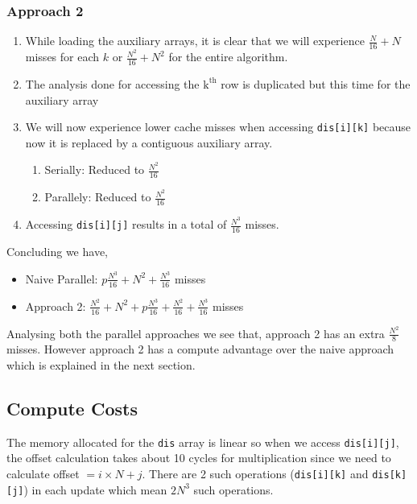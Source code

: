\documentclass{article}
\begin{document}
\subsubsection{Approach 2}
\begin{enumerate}
    \item While loading the auxiliary arrays, it is clear that we will experience $\frac{N}{16} + N$ misses for each $k$ or $\frac{N^2}{16} + N^2$ for the entire algorithm.
    \item The analysis done for accessing the $\mathrm{k}^{\mathrm{th}}$ row is duplicated but this time for the auxiliary array
    \item We will now experience lower cache misses when accessing \texttt{dis[i][k]} because now it is replaced by a contiguous auxiliary array.
    \begin{enumerate}
        \item Serially: Reduced to $\frac{N^2}{16}$
        \item Parallely: Reduced to $\frac{N^2}{16}$
    \end{enumerate}
    \item Accessing \texttt{dis[i][j]} results in a total of $\frac{N^3}{16}$ misses.
\end{enumerate}
Concluding we have,
\begin{itemize}
    \item Naive Parallel: $p\frac{N^3}{16} + N^2 + \frac{N^3}{16}$ misses
    \item Approach 2: $\frac{N^2}{16} + N^2 + p\frac{N^3}{16} + \frac{N^2}{16} + \frac{N^3}{16}$ misses
\end{itemize}
Analysing both the parallel approaches we see that, approach 2 has an extra $\frac{N^2}{8}$ misses. However approach 2 has a compute advantage over the naive approach which is explained in the next section.

\subsection{Compute Costs}
The memory allocated for the \texttt{dis} array is linear so when we access \texttt{dis[i][j]}, the offset calculation takes about 10 cycles for multiplication since we need to calculate offset $=i \times N + j$. There are 2 such operations (\texttt{dis[i][k]} and \texttt{dis[k][j]}) in each update which mean $2N^3$ such operations.
\end{document}
